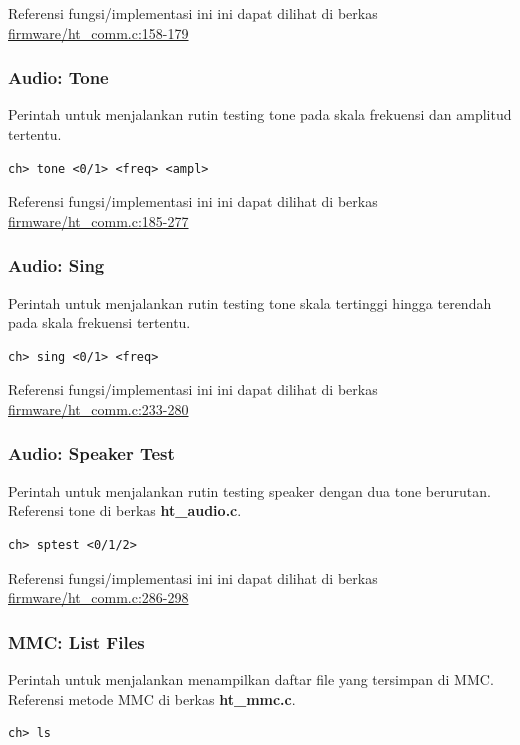 \documentclass[12pt,]{article}
\begin{document}
	Referensi fungsi/implementasi ini ini dapat dilihat di berkas
	\href{https://github.com/VibrasticLab/pikoakustik/blob/stm32f401re_3pin/firmware/ht_comm.c#L158-L179}{firmware/ht\_comm.c:158-179}

	\subsubsection{Audio: Tone}
	Perintah untuk menjalankan rutin testing tone pada skala frekuensi dan amplitud tertentu.
	\begin{verbatim}
ch> tone <0/1> <freq> <ampl>
	\end{verbatim}

	Referensi fungsi/implementasi ini ini dapat dilihat di berkas
	\href{https://github.com/VibrasticLab/pikoakustik/blob/stm32f401re_3pin/firmware/ht_comm.c#L185-L277}{firmware/ht\_comm.c:185-277}
	
	\subsubsection{Audio: Sing}
	Perintah untuk menjalankan rutin testing tone skala tertinggi hingga terendah pada skala frekuensi tertentu.
	\begin{verbatim}
ch> sing <0/1> <freq>
	\end{verbatim}
	
	Referensi fungsi/implementasi ini ini dapat dilihat di berkas
	\href{https://github.com/VibrasticLab/pikoakustik/blob/stm32f401re_3pin/firmware/ht_comm.c#L233-L280}{firmware/ht\_comm.c:233-280}

	\subsubsection{Audio: Speaker Test}
	Perintah untuk menjalankan rutin testing speaker dengan dua tone berurutan.
	Referensi tone di berkas \textbf{ht\_audio.c}.
	\begin{verbatim}
ch> sptest <0/1/2>
	\end{verbatim}
	
	Referensi fungsi/implementasi ini ini dapat dilihat di berkas
	\href{https://github.com/VibrasticLab/pikoakustik/blob/stm32f401re_3pin/firmware/ht_comm.c#L286-L298}{firmware/ht\_comm.c:286-298}
	
	\subsubsection{MMC: List Files}
	Perintah untuk menjalankan menampilkan daftar file yang tersimpan di MMC.
	Referensi metode MMC di berkas \textbf{ht\_mmc.c}.
	\begin{verbatim}
ch> ls
	\end{verbatim}
	
\end{document}
